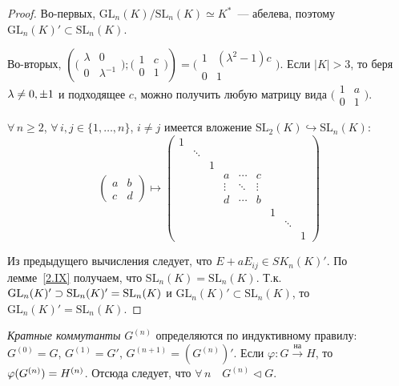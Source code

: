 \documentclass[a4paper]{article}
\newcommand*{\p}[1]{#1\nobreak\discretionary{}{\hbox{$\mathsurround=0pt #1$}}{}}
\begin{document}
\begin{proof}
Во-первых, $\mathrm{GL}_n(K)/\mathrm{SL}_n(K)\simeq K^*$~---
абелева, поэтому $\mathrm{GL}_n(K)'\subset \mathrm{SL}_n(K)$.

Во-вторых, $\left(\bigl(\begin{smallmatrix}\lambda & 0\\
0 & \lambda^{-1}\end{smallmatrix}\bigr); \bigl(\begin{smallmatrix}1
& c\\ 0 & 1\end{smallmatrix}\bigr)\right)=\bigl(\begin{smallmatrix}
1& (\lambda^2-1)c\\ 0& 1\end{smallmatrix}\bigr)$. Если $|K|>3$, то
беря $\lambda\p\neq 0, \pm1$ и подходящее $c$, можно получить любую
матрицу вида $\bigl(\begin{smallmatrix}1& a\\
0& 1\end{smallmatrix}\bigr)$.

$\forall \, n\geqslant 2$, $\forall \, i,j\in\{1,\ldots,n\}$, $i\neq
j$ имеется вложение $\mathrm{SL}_2(K)\hookrightarrow
\mathrm{SL}_n(K)$:
$$\begin{pmatrix}a& b\\ c& d\end{pmatrix}\mapsto
\left(
\begin{smallmatrix}
1 & & & & & & & & \\
  &\ddots & & & & & & & \\
 & & 1& & & & & & \\
 & & &a &\cdots & c & \\
 & & &\vdots & \ddots &\vdots & & & \\
 & & &d &\cdots & b& & & \\
 & & & & & & 1& & \\
 & & & & & & & \ddots &\\
 & & & & & & & & 1
\end{smallmatrix}\right)
$$

Из предыдущего вычисления следует, что $E+aE_{ij}\in SK_n(K)'$. По
лемме~\ref{2.IX} получаем, что $\mathrm{SL}_n(K)=\mathrm{SL}_n(K)$.
Т.к. $\mathrm{GL}_n(K)'\supset \mathrm{SL}_n(K)'\p=\mathrm{SL}_n(K)$
и $\mathrm{GL}_n(K)'\subset \mathrm{SL}_n(K)$, то
$\mathrm{GL}_n(K)'=\mathrm{SL}_n(K)$.
\end{proof}

\emph{Кратные коммутанты} $G^{(n)}$ определяются по индуктивному
правилу: $G^{(0)}=G$, $G^{(1)}=G'$, $G^{(n+1)}=(G^{(n)})'$. Если
$\varphi\colon G\stackrel{\text{на}}{\to} H$, то
$\varphi(G^{(n)})\p=H^{(n)}$. Отсюда следует, что $\forall \, n\quad
G^{(n)}\triangleleft G$.
\end{document}
